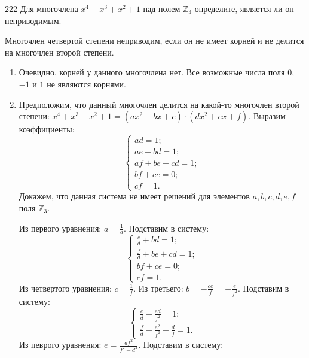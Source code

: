 \begin{task}{222}
Для многочлена $x^4 + x^3 + x^2 + 1$ над полем $\mathbb{Z}_3$ определите, является ли он неприводимым.
\end{task}

\begin{solution}
Многочлен четвертой степени неприводим, если он не имеет корней и не делится на многочлен второй степени.
\begin{enumerate}
\item Очевидно, корней у данного многочлена нет. Все возможные числа поля $0$, $-1$ и $1$ не являются корнями.

\item Предположим, что данный многочлен делится на какой-то многочлен второй степени: $x^4 + x^3 + x^2 + 1 = (ax^2 + bx + c)\cdot(dx^2 + ex + f)$. Выразим коэффициенты:
\begin{equation*}
    \begin{cases}
        ad = 1;\\
        ae + bd = 1;\\
        af + be + cd = 1;\\
        bf + ce = 0;\\
        cf = 1.
    \end{cases}
\end{equation*}
Докажем, что данная система не имеет решений для элементов $a, b, c, d, e, f$ поля $\mathbb{Z}_3$.\par
Из первого уравнения: $a = \frac{1}{d}$. Подставим в систему:
\begin{equation*}
    \begin{cases}
        \frac{e}{d} + bd = 1;\\
        \frac{f}{d} + be + cd = 1;\\
        bf + ce = 0;\\
        cf = 1.
    \end{cases}
\end{equation*}
Из четвертого уравнения: $c = \frac{1}{f}$. Из третьего: $b = -\frac{ce}{f} = -\frac{e}{f^2}$. Подставим в систему:
\begin{equation*}
    \begin{cases}
        \frac{e}{d} - \frac{ed}{f^2} = 1;\\
        \frac{f}{d} - \frac{e^2}{f^2} + \frac{d}{f} = 1.
    \end{cases}
\end{equation*}
Из певрого уравнения: $e = \frac{df^2}{f^2 - d^2}$. Подставим в систему:
\begin{equation*}

\end{equation*}
\end{enumerate}
\end{solution}

